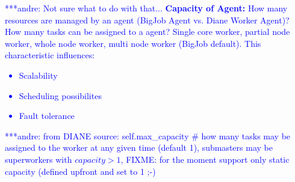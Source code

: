 \documentclass[]{article}
\newcommand{\alnote}[1]{ {\textcolor{blue} { ***andre: #1 }}}
\newcommand{\alnote}[1]{}
\begin{document}


\alnote{Not sure what to do with that...
\textbf{Capacity of Agent:} How many resources are managed by an agent (BigJob Agent vs. Diane Worker Agent)? How many tasks can be assigned to a agent? Single core worker, partial node worker, whole node worker, multi node worker (BigJob
default). This characteristic influences: 
    \begin{itemize}
        \item Scalability
        \item Scheduling possibilites
        \item Fault tolerance
    \end{itemize}
    \alnote{from DIANE source: self.max\_capacity \# how many tasks may be 
    assigned to the worker at any given time (default 1), submasters may be 
    superworkers with $capacity>1$, FIXME: for the moment support only static 
    capacity (defined upfront and set to 1 ;-)}    
}
\end{document}
